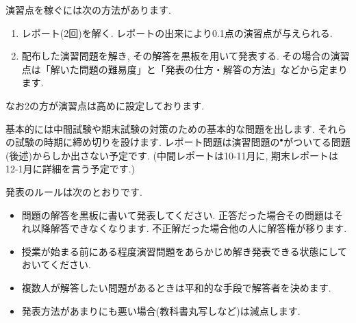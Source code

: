 \documentclass[dvipdfmx,a4paper,11pt]{article}
\theoremstyle{definition}
\begin{document}
\medskip
{}

演習点を稼ぐには次の方法があります.
\begin{enumerate}
  \setlength{\parskip}{0cm} 
  \setlength{\itemsep}{0cm} 
\item レポート(2回)を解く. レポートの出来により0.1点の演習点が与えられる.
\item 配布した演習問題を解き, その解答を黒板を用いて発表する. その場合の演習点は「解いた問題の難易度」と「発表の仕方・解答の方法」などから定まります.
\end{enumerate}

なお2の方が演習点は高めに設定しております.


\medskip
{}

基本的には中間試験や期末試験の対策のための基本的な問題を出します. それらの試験の時期に締め切りを設けます. レポート問題は演習問題の$^{\bullet}$がついてる問題(後述)からしか出さない予定です.
(中間レポートは10-11月に, 期末レポートは12-1月に詳細を言う予定です.)

\newpage
{}

発表のルールは次のとおりです.
\begin{itemize}
  \setlength{\parskip}{0cm} 
  \setlength{\itemsep}{0cm} 
\item 問題の解答を黒板に書いて発表してください. 正答だった場合その問題はそれ以降解答できなくなります. 不正解だった場合他の人に解答権が移ります. 
\item  授業が始まる前にある程度演習問題をあらかじめ解き発表できる状態にしておいてください.
\item 複数人が解答したい問題があるときは平和的な手段で解答者を決めます.
\item 発表方法があまりにも悪い場合(教科書丸写しなど)は減点します.
\end{itemize}
\end{document}
